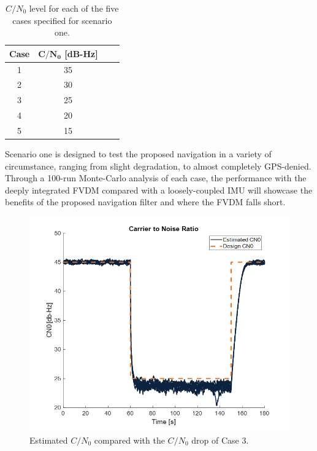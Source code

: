 \begin{table}[!ht]
    \caption{\(C/N_0\) level for each of the five cases specified for scenario one.}\label{tbl:cases}
    \centering
    \begin{tabular}{cccc}
        \toprule
        \textbf{Case} & \textbf{\(\mathbf{C/N_0}\) [dB-Hz]} \\
        \midrule
        1             & 35                                  \\
        2             & 30                                  \\
        3             & 25                                  \\
        4             & 20                                  \\
        5             & 15                                  \\
        \bottomrule
    \end{tabular}
\end{table}

Scenario one is designed to test the proposed navigation in a variety of circumstance, ranging from slight degradation, to almost completely GPS-denied. Through a 100-run Monte-Carlo analysis of each case, the performance with the deeply integrated FVDM compared with a loosely-coupled IMU will showcase the benefits of the proposed navigation filter and where the FVDM falls short.

\begin{figure}[!ht]
    \centering
    \includegraphics[width=0.75\linewidth]{Figures/Results/CN025.png}
    \caption{Estimated \(C/N_0\) compared with the \(C/N_0\) drop of Case 3. }\label{fig:CN025}
\end{figure}



